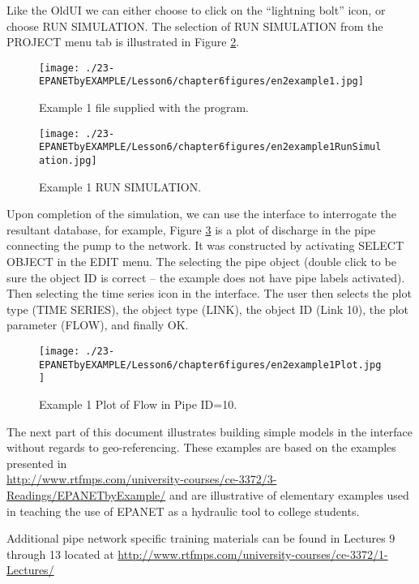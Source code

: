 Like the OldUI we can either choose to click on the ``lightning bolt'' icon, or choose RUN SIMULATION.
The selection of RUN SIMULATION from the PROJECT menu tab is illustrated in Figure \ref{fig:en2example1RunSimulation}.


\clearpage
\begin{figure}[h!] %
   \centering
   \texttt{[image: ./23-EPANETbyEXAMPLE/Lesson6/chapter6figures/en2example1.jpg]} 
   \caption{Example 1 file supplied with the program.}
   \label{fig:en2example1}
\end{figure}


\begin{figure}[h!] %
   \centering
   \texttt{[image: ./23-EPANETbyEXAMPLE/Lesson6/chapter6figures/en2example1RunSimulation.jpg]} 
   \caption{Example 1 RUN SIMULATION.}
   \label{fig:en2example1RunSimulation}
\end{figure}
Upon completion of the simulation, we can use the interface to interrogate the resultant database, for example, Figure \ref{fig:en2example1Plot} is a plot of discharge in the pipe connecting the pump to the network.
It was constructed by activating SELECT OBJECT in the EDIT menu.
The selecting the pipe object (double click to be sure the object ID is correct -- the example does not have pipe labels activated).   
Then selecting the time series icon in the interface.
The user then selects the plot type (TIME SERIES), the object type (LINK), the object ID (Link 10), the plot parameter (FLOW), and finally OK.
\begin{figure}[h!] %
   \centering
   \texttt{[image: ./23-EPANETbyEXAMPLE/Lesson6/chapter6figures/en2example1Plot.jpg]} 
   \caption{Example 1 Plot of Flow in Pipe ID=10.}
   \label{fig:en2example1Plot}
\end{figure}

The next part of this document illustrates building simple models in the interface without regards to geo-referencing.
These examples are based on the examples presented in \\ \url{http://www.rtfmps.com/university-courses/ce-3372/3-Readings/EPANETbyExample/} and are illustrative of elementary examples used in teaching the use of EPANET as a hydraulic tool to college students.

Additional pipe network specific training materials can be found in Lectures 9 through 13 located at
\url{http://www.rtfmps.com/university-courses/ce-3372/1-Lectures/}

